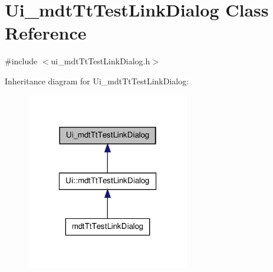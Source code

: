 \hypertarget{class_ui__mdt_tt_test_link_dialog}{\section{Ui\-\_\-mdt\-Tt\-Test\-Link\-Dialog Class Reference}
\label{class_ui__mdt_tt_test_link_dialog}
}


{\ttfamily \#include $<$ui\-\_\-mdt\-Tt\-Test\-Link\-Dialog.\-h$>$}



Inheritance diagram for Ui\-\_\-mdt\-Tt\-Test\-Link\-Dialog\-:\nopagebreak
\begin{figure}[H]
\begin{center}
\leavevmode
\includegraphics[width=202pt]{class_ui__mdt_tt_test_link_dialog__inherit__graph}
\end{center}
\end{figure}


